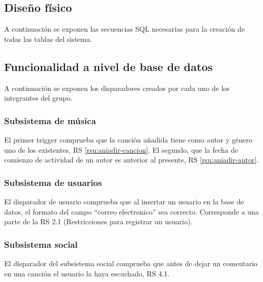 \subsection{Diseño físico}

A continuación se exponen las secuencias SQL necesarias para la creación de todas las tablas del sistema.

 

\subsection{Funcionalidad a nivel de base de datos}

A continuación se exponen los disparadores creados por cada uno de los integrantes del grupo.

\subsubsection{Subsistema de música}

El primer trigger comprueba que la canción añadida tiene como autor y género uno de los existentes, RS \ref{rsu:aniadir-cancion}. El segundo, que la fecha de comienzo de actividad de un autor es anterior al presente, RS \ref{rsu:aniadir-autor}.

 


\subsubsection{Subsistema de usuarios}

El disparador de usuario comprueba que al insertar un usuario en la base de datos, el formato del campo ``correo electronico'' sea correcto. Corresponde a una parte de la RS 2.1 (Restricciones para registrar un usuario).
 

\subsubsection{Subsistema social}
El disparador del subsistema social comprueba que antes de dejar un comentario en una canción el usuario la haya escuchado, RS 4.1.
 

